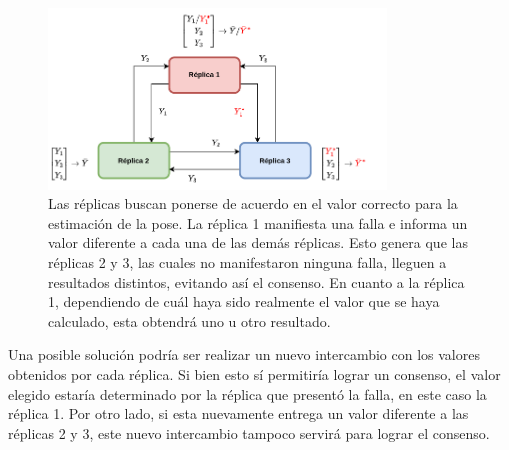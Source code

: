 \begin{figure}[htb]
    \centering
    \includegraphics[width=0.8\textwidth]{img/TMR_sin_arbitro_consenso_falla.png}
    \caption{Las réplicas buscan ponerse de acuerdo en el valor correcto para la estimación de la pose. La réplica 1 manifiesta una falla e informa un valor diferente a cada una de las demás réplicas. Esto genera que las réplicas 2 y 3, las cuales no manifestaron ninguna falla, lleguen a resultados distintos, evitando así el consenso. En cuanto a la réplica 1, dependiendo de cuál haya sido realmente el valor que se haya calculado, esta obtendrá uno u otro resultado.}
    \label{fig:TMR_sin_arbitro_consenso_falla}
\end{figure}



Una posible solución podría ser realizar un nuevo intercambio con los valores obtenidos por cada réplica. Si bien esto sí permitiría lograr un consenso, el valor elegido estaría determinado por la réplica que presentó la falla, en este caso la réplica 1. Por otro lado, si esta nuevamente entrega un valor diferente a las réplicas 2 y 3, este nuevo intercambio tampoco servirá para lograr el consenso.


